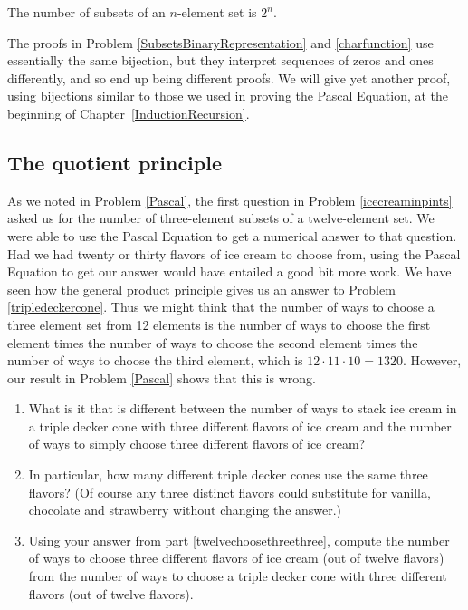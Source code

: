 \begin{theorem} The number of subsets of an $n$-element set is
$2^n$.
\end{theorem}


The proofs in Problem \ref{SubsetsBinaryRepresentation} and
\ref{charfunction} use essentially the same bijection, but they
interpret sequences of zeros and ones differently, and so end up being
different proofs. We will give yet another proof, using bijections
similar to those we used in proving the Pascal Equation, at the
beginning of Chapter~\ref{InductionRecursion}.


\subsection{The quotient principle}

\bp
\iteme As we noted in Problem \ref{Pascal}, the first question in
Problem \ref{icecreaminpints} asked us for the number of three-element
subsets of a twelve-element set.  We were able to use the Pascal Equation to
get a numerical answer to that question.  Had we had twenty or thirty flavors
of ice cream to choose from, using the Pascal Equation to get our answer
would have entailed a good bit more work. We have seen how the general
product principle gives us an answer to Problem \ref{tripledeckercone}.  Thus
we might think that the number of ways to choose a three element set from 12
elements is the number of ways to choose the first element times the number
of ways to choose the second element times the number of ways to choose the
third element, which is $12\cdot11\cdot10=1320$.  However, our result in
Problem \ref{Pascal} shows that this is wrong. \label{twelvechoosethree}
\begin{enumerate}
\item What is it that is different between the number of ways to stack
  ice cream in a triple decker cone with three different flavors of
  ice cream and the number of ways to simply choose three different
  flavors of ice cream? 
\item  In particular, how many different triple
  decker cones use the same three flavors?  (Of course any three
  distinct flavors could substitute for vanilla, chocolate and
  strawberry without changing the answer.)\label{twelvechoosethreethree}
\item Using your answer from part \ref{twelvechoosethreethree},
  compute the number of ways to choose three different flavors of ice
  cream (out of twelve flavors) from the number of ways to choose a
  triple decker cone with three different flavors (out of twelve
  flavors).\label{twelvechoosethreefinal}
\end{enumerate}

